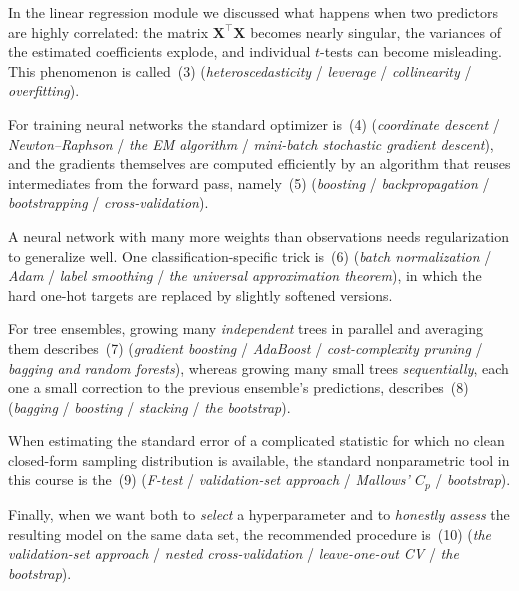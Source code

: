 \documentclass[11pt,a4paper]{article}
\begin{document}
In the linear regression module we discussed what happens when two predictors are highly correlated: the matrix $\mathbf{X}^\top\mathbf{X}$ becomes nearly singular, the variances of the estimated coefficients explode, and individual $t$-tests can become misleading. This phenomenon is called \underline{\hspace{2.5cm}}\,(3) (\emph{heteroscedasticity} / \emph{leverage} / \emph{collinearity} / \emph{overfitting}).

For training neural networks the standard optimizer is \underline{\hspace{2.5cm}}\,(4) (\emph{coordinate descent} / \emph{Newton--Raphson} / \emph{the EM algorithm} / \emph{mini-batch stochastic gradient descent}), and the gradients themselves are computed efficiently by an algorithm that reuses intermediates from the forward pass, namely \underline{\hspace{2.5cm}}\,(5) (\emph{boosting} / \emph{backpropagation} / \emph{bootstrapping} / \emph{cross-validation}).

A neural network with many more weights than observations needs regularization to generalize well. One classification-specific trick is \underline{\hspace{2.5cm}}\,(6) (\emph{batch normalization} / \emph{Adam} / \emph{label smoothing} / \emph{the universal approximation theorem}), in which the hard one-hot targets are replaced by slightly softened versions.

For tree ensembles, growing many \emph{independent} trees in parallel and averaging them describes \underline{\hspace{2.5cm}}\,(7) (\emph{gradient boosting} / \emph{AdaBoost} / \emph{cost-complexity pruning} / \emph{bagging and random forests}), whereas growing many small trees \emph{sequentially}, each one a small correction to the previous ensemble's predictions, describes \underline{\hspace{2.5cm}}\,(8) (\emph{bagging} / \emph{boosting} / \emph{stacking} / \emph{the bootstrap}).

When estimating the standard error of a complicated statistic for which no clean closed-form sampling distribution is available, the standard nonparametric tool in this course is the \underline{\hspace{2.5cm}}\,(9) (\emph{F-test} / \emph{validation-set approach} / \emph{Mallows' $C_p$} / \emph{bootstrap}).

Finally, when we want both to \emph{select} a hyperparameter and to \emph{honestly assess} the resulting model on the same data set, the recommended procedure is \underline{\hspace{2.5cm}}\,(10) (\emph{the validation-set approach} / \emph{nested cross-validation} / \emph{leave-one-out CV} / \emph{the bootstrap}).
\end{document}
